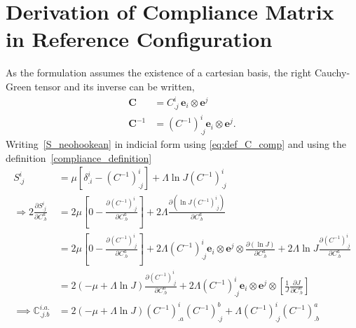 \section{Derivation of Compliance Matrix in Reference Configuration}
    As the formulation assumes the existence of a cartesian basis, the right Cauchy-Green tensor and its inverse can be written, 
    \begin{equation} \label{eq:def_C_comp}
        \begin{split}
        {\boldsymbol{C}} &= {C^i_{.j}\, \boldsymbol{e}_i \otimes \boldsymbol{e}^j}\\
        {\boldsymbol{C}}^{-1} &= {\left(C^{-1}\right)^i_{.j} \boldsymbol{e}_i \otimes \boldsymbol{e}^j}.
        \end{split}
    \end{equation}
Writing~\eqref{S_neohookean} in indicial form using \eqref{eq:def_C_comp} and using the definition~\eqref{compliance_definition}
    \begin{equation} \label{eq:ref_comp_1}
        \begin{split}
            {S^i_{.j}} &= \mu {\left[\delta ^i_{.i} - \left(C^{-1}\right)^i_{.j}\right] + \Lambda \ln{J} \left(C^{-1}\right)^i_{.j}}\\
        {\Rightarrow 2\frac{\partial S^i_{.j}}{\partial C^a_{.b}}} &= 2\mu {\left[0 - \frac{\partial \left(C^{-1}\right)^i_{.j}}{\partial C^a_{.b}} \right] + 2\Lambda\frac{\partial \left(\ln{J}\left(C^{-1}\right)^i_{.j}\right)}{\partial C^a_{.b}}}\\
            &= 2\mu {\left[0 - \frac{\partial \left(C^{-1}\right)^i_{.j}}{\partial C^a_{.b}} \right] + 2\Lambda \left(C^{-1}\right)^i_{.j} \boldsymbol{e}_i \otimes \boldsymbol{e}^j \otimes \frac{\partial \left(\ln{J}\right)}{\partial C^a_{.b}} + 2\Lambda\ln{J} \frac{\partial \left(C^{-1}\right)^i_{.j}}{\partial C^a_{.b}}}\\
            &= {2\left(-\mu + \Lambda\ln{J}\right) \frac{\partial \left(C^{-1}\right)^i_{.j}}{\partial C^a_{.b}} + 2\Lambda\left(C^{-1}\right)^i_{.j} \boldsymbol{e}_i \otimes \boldsymbol{e}^j \otimes \left[\frac{1}{J} \frac{\partial J}{\partial C^a_{.b}}\right]}\\
        \implies \mathbb{C}^{i.a.}_{.j.b} &= 2\left(-\mu + \Lambda\ln{{J}}\right)\left({C}^{-1}\right)^{i}_{.a} \left({C}^{-1}\right)^{b}_{.j} + \Lambda {\left(C^{-1}\right)^i_{.j} \left(C^{-1}\right)^a_{.b}}
        \end{split}
    \end{equation}
